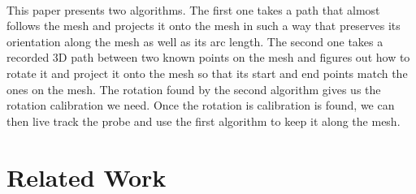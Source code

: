 \documentclass[11pt,psfig]{article}
\begin{document}
\\
This paper presents two algorithms. The first one takes a path that almost follows the mesh and projects it onto the mesh in such a way that preserves its orientation along the mesh as well as its arc length. The second one takes a recorded 3D path between two known points on the mesh and figures out how to rotate it and project it onto the mesh so that its start and end points match the ones on the mesh. The rotation found by the second algorithm gives us the rotation calibration we need. Once the rotation is calibration is found, we can then live track the probe and use the first algorithm to keep it along the mesh. 

\section*{Related Work}
\end{document}
